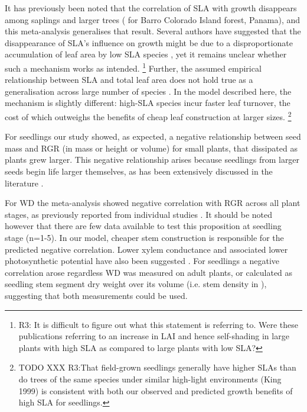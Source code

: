 \documentclass[a4paper,11pt]{article}
\begin{document}
It has previously been noted that the correlation of SLA with growth disappears among saplings and larger trees (\citealt{Wright:2010tp} for Barro Colorado Island forest, Panama), and this meta-analysis generalises that result. Several authors have suggested that the disappearance of SLA's influence on growth might be due to a disproportionate accumulation of leaf area by low SLA species \citep{Reich:1992wm,Poorter:2008iu,Wright:2010tp}, yet it remains unclear whether such a mechanism works as intended. \footnote{R3:  It is difficult to figure out what this statement is referring to. Were these publications referring to an increase in LAI and hence self-shading in large plants with high SLA as compared to large plants with low SLA?} Further, the assumed empirical relationship between SLA and total leaf area does not hold true as a generalisation across large number of species \citep{Duursma-2015}. In the model described here, the mechanism is slightly different: high-SLA species incur faster leaf turnover, the cost of which outweighs the benefits of cheap leaf construction at larger sizes. \footnote{TODO XXX R3:That field-grown seedlings generally have higher SLAs than do trees of the same species under similar high-light environments (King 1999) is consistent with both our observed and predicted growth benefits of high SLA for seedlings.}

For seedlings our study showed, as expected, a negative relationship between seed mass and RGR (in mass or height or volume) for small plants, that dissipated as plants grew larger. This negative relationship arises because seedlings from larger seeds begin life larger themselves, as has been extensively discussed in the literature \citep[reviewed by][]{Turnbull:2012ew}. 

For WD the meta-analysis showed negative correlation with RGR across all plant stages, as previously reported from individual studies \citep{Wright:2010tp,Ruger:2012jv}. It should be noted however that there are few data available to test this proposition at seedling stage (n=1-5). In our model, cheaper stem construction is responsible for the predicted negative correlation. Lower xylem conductance and associated lower photosynthetic potential have also been suggested \citep[reviewed by][]{Chave:2009iy}.
For seedlings a negative correlation arose regardless WD was measured on adult plants, or calculated as seedling stem segment dry weight over its volume (i.e. stem density in  \citealt{CastroDiez:1998gz}), suggesting that both measurements could be used.
\end{document}
